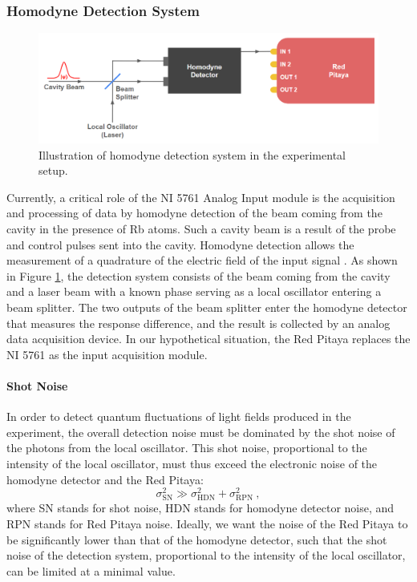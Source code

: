 \subsubsection{Homodyne Detection System}

\begin{figure}[ht]
    \centering
    \includegraphics[width=0.9\columnwidth]{images/chapter_2/2_noise/homo_detection.png}
    \caption{Illustration of homodyne detection system in the experimental setup.}
    \label{fig:ch2_homo_detection}
\end{figure}

\noindent Currently, a critical role of the NI 5761 Analog Input module is the acquisition and processing of data by homodyne detection of the beam coming from the cavity in the presence of Rb atoms. Such a cavity beam is a result of the probe and control pulses sent into the cavity. Homodyne detection allows the measurement of a quadrature of the electric field of the input signal \cite{valentin}. As shown in Figure \ref{fig:ch2_homo_detection}, the detection system consists of the beam coming from the cavity and a laser beam with a known phase serving as a local oscillator entering a beam splitter. The two outputs of the beam splitter enter the homodyne detector that measures the response difference, and the result is collected by an analog data acquisition device. In our hypothetical situation, the Red Pitaya replaces the NI 5761 as the input acquisition module.

\paragraph{Shot Noise }

In order to detect quantum fluctuations of light fields produced in the experiment, the overall detection noise must be dominated by the shot noise of the photons from the local oscillator. This shot noise, proportional to the intensity of the local oscillator, must thus exceed the electronic noise of the homodyne detector and the Red Pitaya:
\begin{equation}\label{eq:noise}
    \sigma^2_\text{SN} \gg \sigma^2_\text{HDN} + \sigma^2_\text{RPN}\ ,
\end{equation}
where SN stands for shot noise, HDN stands for homodyne detector noise, and RPN stands for Red Pitaya noise. Ideally, we want the noise of the Red Pitaya to be significantly lower than that of the homodyne detector, such that the shot noise of the detection system, proportional to the intensity of the local oscillator, can be limited at a minimal value.

